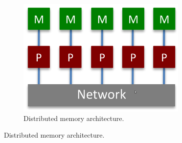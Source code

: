 \begin{description}
\begin{figure}
\begin{subfigure}{0.55\textwidth}
 	\end{subfigure}%
 	\begin{subfigure}{0.45\textwidth}
 		\centering
 		\caption{Distributed memory architecture.}
 		\label{fig:distribuiteMemory}
 		\includegraphics[width=0.92\textwidth]{./images/parallel_programming/distribuitedMemory}
 	\end{subfigure}%
 \end{figure}
 

 
 

\end{description}
